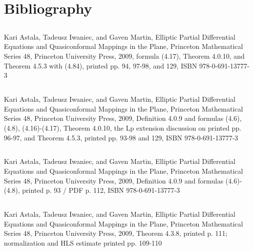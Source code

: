 \documentclass[10pt,oneside]{article}
\begin{document}
\clearpage
\section{Bibliography}
\subsection*{\texttt{}}
Kari Astala, Tadeusz Iwaniec, and Gaven Martin, Elliptic Partial Differential Equations and Quasiconformal Mappings in the Plane, Princeton Mathematical Series 48, Princeton University Press, 2009, formula (4.17), Theorem 4.0.10, and Theorem 4.5.3 with (4.84), printed pp. 94, 97-98, and 129, ISBN 978-0-691-13777-3

\subsection*{\texttt{}}
Kari Astala, Tadeusz Iwaniec, and Gaven Martin, Elliptic Partial Differential Equations and Quasiconformal Mappings in the Plane, Princeton Mathematical Series 48, Princeton University Press, 2009, Definition 4.0.9 and formulas (4.6), (4.8), (4.16)-(4.17), Theorem 4.0.10, the Lp extension discussion on printed pp. 96-97, and Theorem 4.5.3, printed pp. 93-98 and 129, ISBN 978-0-691-13777-3

\subsection*{\texttt{}}
Kari Astala, Tadeusz Iwaniec, and Gaven Martin, Elliptic Partial Differential Equations and Quasiconformal Mappings in the Plane, Princeton Mathematical Series 48, Princeton University Press, 2009, Definition 4.0.9 and formulas (4.6)-(4.8), printed p. 93 / PDF p. 112, ISBN 978-0-691-13777-3

\subsection*{\texttt{}}
Kari Astala, Tadeusz Iwaniec, and Gaven Martin, Elliptic Partial Differential Equations and Quasiconformal Mappings in the Plane, Princeton Mathematical Series 48, Princeton University Press, 2009, Theorem 4.3.8, printed p. 111; normalization and HLS estimate printed pp. 109-110
\end{document}
